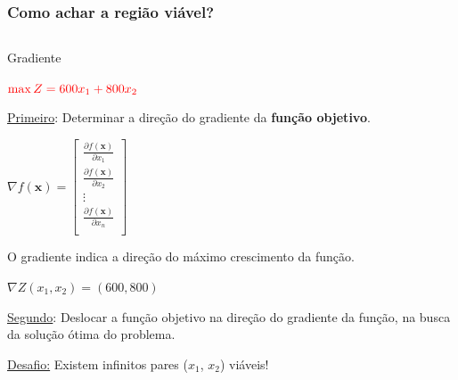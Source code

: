 \documentclass{beamer}
\begin{document}
\begin{frame}	
	\frametitle{Como achar a região viável?}
	\begin{columns}
		\begin{column}{0.5\textwidth}
			\begin{exampleblock}{Gradiente}
				\begin{itemize}
					 {\item[] $ \color{red}\max Z = 600x_1 + 800x_2$}
					 {\item[] \underline{Primeiro}: Determinar a direção do gradiente da \textbf{função objetivo}.}
					 {\item[] $ \nabla f(\mathbf{x}) = \begin{bmatrix}
																\frac{\partial f(\mathbf{x})}{\partial x_1} \\
																\frac{\partial f(\mathbf{x})}{\partial x_2} \\
																\vdots \\
																\frac{\partial f(\mathbf{x})}{\partial x_n} \\
															\end{bmatrix} $}
					 {\item[] O gradiente indica a direção do máximo crescimento da função.}
					 {\item[] $\nabla Z(x_1,x_2) = (600,800)$}
					 {\item[] \underline{Segundo}: {\color{red}Deslocar a função objetivo} na direção do gradiente da função, na busca da solução ótima do problema.}
					 {\item[] \color{red} \underline{Desafio:} Existem infinitos pares ($x_1$, $x_2$) viáveis!} 
				\end{itemize}
			\end{exampleblock}
			

\end{column}
\end{columns}
\end{frame}
\end{document}
